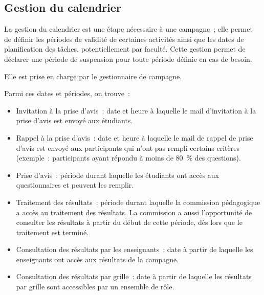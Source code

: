 \documentclass[a4paper,11pt]{report}
\begin{document}
\subsection{Gestion du calendrier}
La gestion du calendrier est une étape nécessaire à une campagne~; elle permet de définir les périodes de validité de certaines activités ainsi que les dates de planification des tâches, potentiellement par faculté.
Cette gestion permet de déclarer une période de suspension pour toute période définie en cas de besoin.

\noindent Elle est prise en charge par le gestionnaire de campagne.

\noindent Parmi ces dates et périodes, on trouve~:
\begin{itemize}
	\item Invitation à la prise d'avis~: date et heure à laquelle le mail d'invitation à la prise d'avis est envoyé aux étudiants.
	\item Rappel à la prise d'avis~: date et heure à laquelle le mail de rappel de prise d'avis est envoyé aux participants qui n'ont pas rempli certains critères (exemple~: participants ayant répondu à moins de 80~\% des questions).
	\item Prise d'avis~: période durant laquelle les étudiants ont accès aux questionnaires et peuvent les remplir.
	\item Traitement des résultats~: période durant laquelle la commission pédagogique a accès au traitement des résultats. La commission a aussi l'opportunité de consulter les résultats à partir du début de cette période, dès lors que le traitement est terminé.
	\item Consultation des résultats par les enseignants~: date à partir de laquelle les enseignants ont accès aux résultats de la campagne.
	\item Consultation des résultats par grille~: date à partir de laquelle les résultats par grille sont accessibles par un ensemble de rôle.
\end{itemize}
~\newline{}
\end{document}
